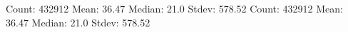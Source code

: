 Count: 432912
Mean: 36.47
Median: 21.0
Stdev: 578.52
Count: 432912
Mean: 36.47
Median: 21.0
Stdev: 578.52
